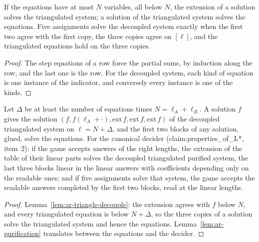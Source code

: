 \begin{lemma}
\label{lem:ar-triangle-decouple}
\leanok
If the equations have at most $N$ variables, all below $N$, the extension of a solution solves
the triangulated system; a solution of the triangulated system solves the equations. Five
assignments solve the decoupled system exactly when the first two agree with the first copy, the
three copies agree on $[\ell]$, and the triangulated equations hold on the three copies.
\end{lemma}

\begin{proof}
\leanok
The step equations of a row force the partial sums, by induction along the row, and the last
one is the row. For the decoupled system, each kind of equation is one instance of the
indicator, and conversely every instance is one of the kinds.
\end{proof}

\begin{lemma}
\label{lem:ar-extend}
\leanok
Let $\Delta$ be at least the number of equations times $N = \ell_A + \ell_B$. A solution $f$ gives
the solution $(f, f(\ell_A + \cdot), \mathrm{ext}\, f, \mathrm{ext}\, f, \mathrm{ext}\, f)$ of the
decoupled triangulated system on $\ell = N + \Delta$, and the first two blocks of any solution,
glued, solve the equations. For the canonical decider (claim:properties\_of\_L*, item~2): if the
game accepts answers of the right lengths, the extension of the table of their linear parts
solves the decoupled triangulated purified system, the last three blocks linear in the linear
answers with coefficients depending only on the readable ones; and if five assignments solve that
system, the game accepts the readable answers completed by the first two blocks, read at the
linear lengths.
\end{lemma}

\begin{proof}
\leanok
Lemma~\ref{lem:ar-triangle-decouple}: the extension agrees with $f$ below $N$, and every
triangulated equation is below $N + \Delta$, so the three copies of a solution solve the
triangulated system and hence the equations. Lemma~\ref{lem:ar-purification} translates
between the equations and the decider.
\end{proof}

